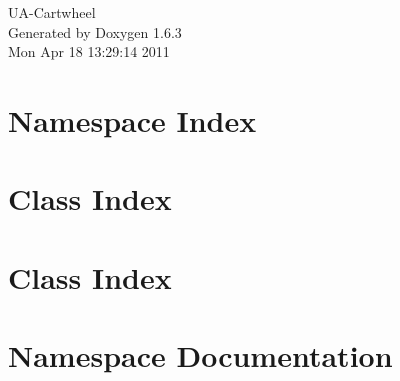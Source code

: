 \documentclass[a4paper]{book}
\begin{document}
\hypersetup{pageanchor=false}
\begin{titlepage}
\vspace*{7cm}
\begin{center}
{\Large UA-\/Cartwheel }\\
\vspace*{1cm}
{\large Generated by Doxygen 1.6.3}\\
\vspace*{0.5cm}
{\small Mon Apr 18 13:29:14 2011}\\
\end{center}
\end{titlepage}
\clearemptydoublepage
{}
\tableofcontents
\clearemptydoublepage
{}
\hypersetup{pageanchor=true}
\chapter{Namespace Index}

\chapter{Class Index}

\chapter{Class Index}

\chapter{Namespace Documentation}

\end{document}
